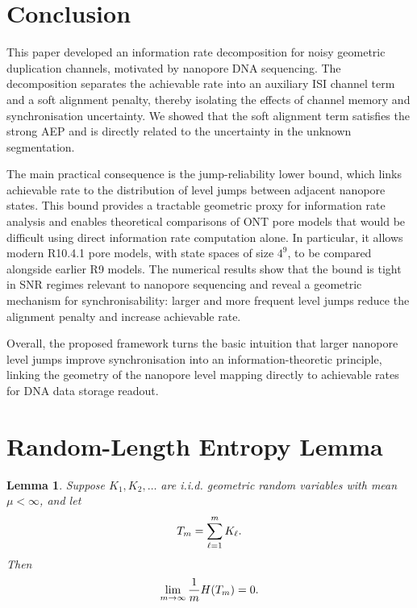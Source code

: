 \documentclass[onecolumn]{IEEEtran}
\newtheorem{lemma}{Lemma}
\theoremstyle{definition}
\begin{document}
\section{Conclusion}

This paper developed an information rate decomposition for noisy geometric duplication channels, motivated by nanopore DNA sequencing. The decomposition separates the achievable rate into an auxiliary ISI channel term and a soft alignment penalty, thereby isolating the effects of channel memory and synchronisation uncertainty. We showed that the soft alignment term satisfies the strong AEP and is directly related to the uncertainty in the unknown segmentation.

The main practical consequence is the jump-reliability lower bound, which links achievable rate to the distribution of level jumps between adjacent nanopore states. This bound provides a tractable geometric proxy for information rate analysis and enables theoretical comparisons of ONT pore models that would be difficult using direct information rate computation alone. In particular, it allows modern R10.4.1 pore models, with state spaces of size $4^9$, to be compared alongside earlier R9 models. The numerical results show that the bound is tight in SNR regimes relevant to nanopore sequencing and reveal a geometric mechanism for synchronisability: larger and more frequent level jumps reduce the alignment penalty and increase achievable rate.

Overall, the proposed framework turns the basic intuition that larger nanopore level jumps improve synchronisation into an information-theoretic principle, linking the geometry of the nanopore level mapping directly to achievable rates for DNA data storage readout.


\appendices
\renewcommand{\thelemma}{A\arabic{lemma}} \setcounter{lemma}{0}

\section{Random-Length Entropy Lemma}
\label{appendix:entropy_length}


\begin{lemma}\label{lemma:ent_obs_len}
Suppose \(K_1,K_2,\ldots\) are i.i.d. geometric random variables with mean \(\mu<\infty\), and let
\begin{align}
    T_m = \sum_{\ell=1}^m K_\ell .\notag
\end{align}
Then
\begin{align}
    \lim_{m\to\infty}\frac{1}{m}H(T_m)=0.\notag
\end{align}
\end{lemma}
\end{document}
